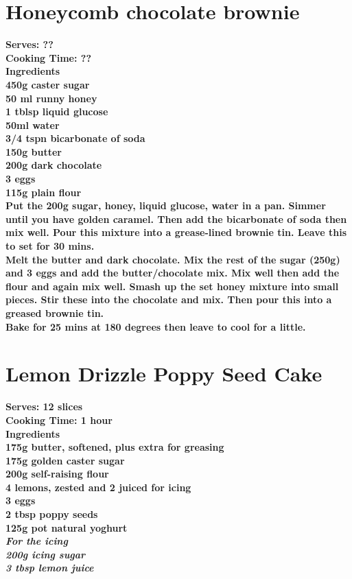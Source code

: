 \documentclass[18pt, oneside]{book}
\begin{document}
\section{Honeycomb chocolate brownie}
\bf{Serves: ??} \\
\bf{Cooking Time: ??} \\

\bf{Ingredients} \normalfont \\ 
450g caster sugar \\
50 ml runny honey \\
1 tblsp liquid glucose \\
50ml water \\
3/4 tspn bicarbonate of soda \\
150g butter \\
200g dark chocolate \\
3 eggs \\
115g plain flour \\

Put the 200g sugar, honey, liquid glucose, water in a pan. Simmer until you have golden caramel. Then add the bicarbonate of soda then mix well. Pour this mixture into a grease-lined brownie tin. Leave this to set for 30 mins. \\

Melt the butter and dark chocolate. Mix the rest of the sugar (250g) and 3 eggs and add the butter/chocolate mix. Mix well then add the flour and again mix well. Smash up the set honey mixture into small pieces. Stir these into the chocolate  and mix. Then pour this into a greased brownie tin. \\

Bake for 25 mins at 180 degrees then leave to cool for a little. 

\section{Lemon Drizzle Poppy Seed Cake}
\bf{Serves: 12 slices} \\
\bf{Cooking Time: 1 hour} \\

\bf{Ingredients} \normalfont \\ 
175g butter, softened, plus extra for greasing \\
175g golden caster sugar \\
200g self-raising flour \\
4 lemons, zested and 2 juiced for icing \\
3 eggs \\
2 tbsp poppy seeds \\
125g pot natural yoghurt \\
\it{For the icing } \normalfont \\
200g icing sugar \\
3 tbsp lemon juice \\
\end{document}
